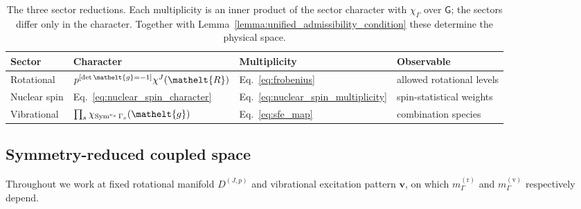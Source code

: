 \documentclass[
  reprint,
  aps,
  prx,
  superscriptaddress,
  amsmath,
  amssymb,
  longbibliography
]{revtex4-2}
\newcommand{\eltfont}[1]{{\let\sigma\eltsigma\mathelt{#1}}}
\newcommand{\grp}[1]{\mathsf{#1}}
\newcommand{\elt}[1]{\eltfont{#1}}
\newcommand{\iverson}[1]{[#1]}
\newcommand{\irrJp}[2]{D^{(#1,#2)}}
\newcommand{\gel}{\elt{g}}             %
\newcommand{\rotpart}{\elt{R}}         %
\newcommand{\parity}{p}               %
\begin{document}
\begin{table}[t]
\caption{The three sector reductions. Each multiplicity is an inner product of the sector
character with $\chi_\Gamma$ over $\grp{G}$; the sectors differ only in the character.
Together with Lemma~\ref{lemma:unified_admissibility_condition} these determine the physical space.}
\label{tab:sector_summary}
\centering
\footnotesize
\begin{tabular}{llll}
\toprule
Sector & Character & Multiplicity & Observable\\
\midrule
Rotational
& $\parity^{\iverson{\det\gel=-1}}\chi^J(\rotpart)$
& Eq.~\eqref{eq:frobenius}
& allowed rotational levels\\
Nuclear spin
& Eq.~\eqref{eq:nuclear_spin_character}
& Eq.~\eqref{eq:nuclear_spin_multiplicity}
& spin-statistical weights\\
Vibrational
& $\prod_s\chi_{\operatorname{Sym}^{v_s}\Gamma_s}(\gel)$
& Eq.~\eqref{eq:sfe_map}
& combination species\\
\bottomrule
\end{tabular}
\end{table}




\subsection{Symmetry-reduced coupled space}

Throughout we work at fixed rotational manifold $\irrJp{J}{\parity}$ and vibrational excitation pattern $\mathbf v$, on which $m^{(\mathrm r)}_\Gamma$ and $m^{(\mathrm v)}_\Gamma$ respectively depend.
\end{document}
